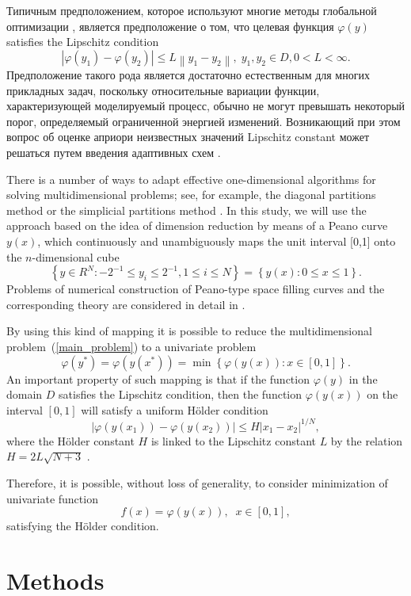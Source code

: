 \documentclass[sensors,article,submit,moreauthors,pdftex]{Definitions/mdpi}
\begin{document}
Типичным предположением, которое используют многие методы глобальной оптимизации \cite{Sergeyev2013,Evtushenko2013,Jones2009,Zilinskas2010,Sergeyev2021}, является предположение о том, что целевая функция $\varphi(y)$ satisfies the Lipschitz condition
\[
\left|\varphi(y_1)-\varphi(y_2)\right|\leq L\left\|y_1-y_2\right\|,\; y_1,y_2 \in D, 0<L<\infty.
\]
Предположение такого рода является достаточно естественным для многих прикладных задач, поскольку относительные вариации функции, характеризующей моделируемый процесс, обычно не могут превышать некоторый порог, определяемый ограниченной энергией изменений. Возникающий при этом вопрос об оценке априори неизвестных значений Lipschitz constant может решаться путем введения адаптивных схем \cite{Strongin2020,Strongin2020_1}.

There is a number of ways to adapt effective one-dimensional algorithms for solving multidimensional problems; see, for example, the diagonal partitions method \cite{Sergeyev2017} or the simplicial partitions method \cite{Zilinskas2014}. In this study, we will use the approach based on the idea of dimension reduction by means of a Peano curve $y(x)$, which continuously and unambiguously maps the unit interval [0,1] onto the $n$-dimensional cube
\[
\left\{y\in R^N: -2^{-1}\leq y_i \leq 2^{-1}, 1 \leq i \leq N\right\}=\left\{y(x):0\leq x \leq 1 \right\}.
\]
Problems of numerical construction of Peano-type space filling curves and the corresponding theory are considered in detail in \cite{Strongin2000,Sergeyev2013}.

By using this kind of mapping it is possible to reduce the multidimensional problem~(\ref{main_problem}) to a univariate problem
\[
\varphi(y^\ast)=\varphi(y(x^\ast))=\min{\left\{\varphi(y(x)): x\in[0,1]\right\}}.
\]
An important property of such mapping is that if the function $\varphi(y)$ in the domain $D$ satisfies the Lipschitz condition, then the function $\varphi(y(x))$ on the interval $[0,1]$ will satisfy a uniform H{\"o}lder condition
\[
\left|\varphi(y(x_1))-\varphi(y(x_2))\right|\leq H\left|x_1-x_2\right|^{1/N},
\]
where the H{\"o}lder constant $H$ is linked to the Lipschitz constant $L$ by the relation $H=2L\sqrt{N+3}$ \cite{Strongin2000}.

Therefore, it is possible, without loss of generality, to consider minimization of univariate function
\[
f(x)=\varphi(y(x)), \;\; x\in[0,1],
\]
satisfying the H{\"o}lder condition.

 
\section{Methods}
\end{document}
